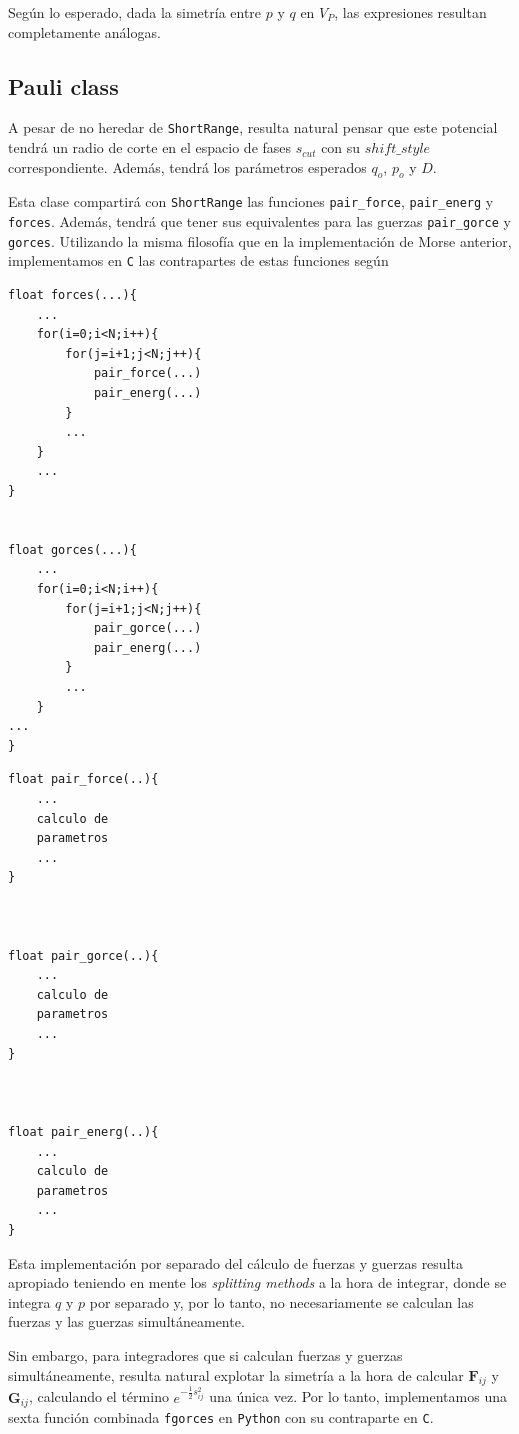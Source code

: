 \documentclass[twoside, 12pt]{article}
\begin{document}
Según lo esperado, dada la simetría entre $p$ y $q$ en $V_P$, las expresiones resultan completamente análogas. 

\subsection{Pauli class}

A pesar de no heredar de \texttt{ShortRange}, resulta natural pensar que este potencial tendrá un radio de corte en el espacio de fases $s_{cut}$ con su $shift\_style$ correspondiente. Además, tendrá los parámetros 
esperados $q_o$, $p_o$ y $D$.

Esta clase compartirá con \texttt{ShortRange} las funciones \texttt{pair\_force}, \texttt{pair\_energ} y \texttt{forces}. Además, tendrá que tener sus equivalentes para las guerzas \texttt{pair\_gorce} y \texttt{gorces}. 
Utilizando la misma filosofía que en la implementación de Morse anterior, implementamos en \texttt{C} las contrapartes de estas funciones según 

\begin{multicols}{2}
\begin{lstlisting}
float forces(...){
	...
	for(i=0;i<N;i++){
		for(j=i+1;j<N;j++){
			pair_force(...)
			pair_energ(...)
		}	
		...
	}
	...
}


float gorces(...){
	...
	for(i=0;i<N;i++){
		for(j=i+1;j<N;j++){
			pair_gorce(...)
			pair_energ(...)
		}	
		...
	}
...
}

\end{lstlisting} 
\columnbreak
\begin{lstlisting}
float pair_force(..){
	...
	calculo de 
	parametros
	...
}



float pair_gorce(..){
	...
	calculo de 
	parametros
	...
}



float pair_energ(..){
	...
	calculo de 
	parametros
	...
}

\end{lstlisting} 
\end{multicols}

Esta implementación por separado del cálculo de fuerzas y guerzas resulta apropiado teniendo en mente los \textit{splitting methods} a la hora de integrar, donde se integra $q$ y $p$ por separado y, por lo tanto, 
no necesariamente se calculan las fuerzas y las guerzas simultáneamente.

Sin embargo, para integradores que si calculan fuerzas y guerzas simultáneamente, resulta natural explotar la simetría a la hora de calcular $\mathbf{F}_{ij}$ y $\mathbf{G}_{ij}$, calculando el término 
$e^{-\frac{1}{2}s_{ij}^2}$ una única vez. Por lo tanto, implementamos una sexta función combinada \texttt{fgorces} en \texttt{Python} con su contraparte en \texttt{C}.
\end{document}
